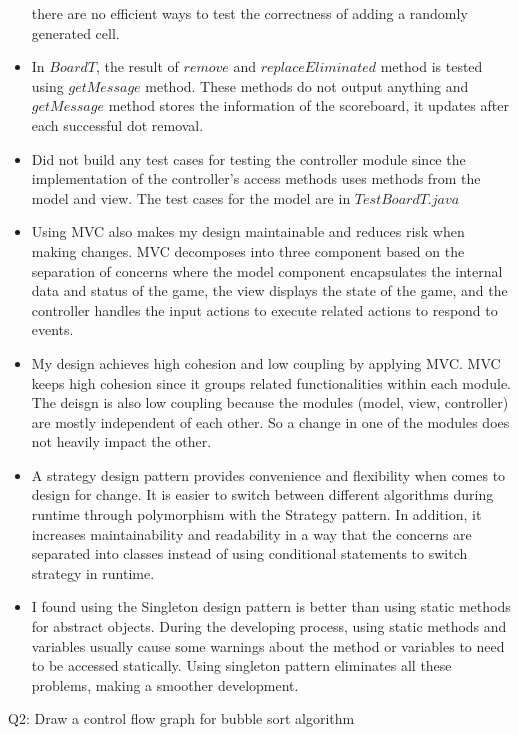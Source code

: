 \documentclass[12pt]{article}
\begin{document}
\begin{itemize}
        there are no efficient ways to test the correctness of adding a randomly generated cell.
  \item In $BoardT$, the result of $remove$ and $replaceEliminated$ method is tested using $getMessage$ method. These methods do
        not output anything and $getMessage$ method stores the information of the scoreboard, it updates after each successful dot removal.
  \item Did not build any test cases for testing the controller module since the implementation of the controller's access methods uses 
        methods from the model and view. The test cases for the model are in $TestBoardT.java$
  \item Using MVC also makes my design maintainable and reduces risk when making changes. MVC decomposes into three 
        component based on the separation of concerns where the model component encapsulates the internal 
        data and status of the game, the view displays the state of the game, and the controller handles
        the input actions to execute related actions to respond to events.
  \item My design achieves high cohesion and low coupling by applying MVC. MVC keeps high cohesion since
        it groups related functionalities within each module. The deisgn is also low coupling because
        the modules (model, view, controller) are mostly independent of each other. So a change in one of the
        modules does not heavily impact the other.
  \item A strategy design pattern provides convenience and flexibility when comes to design for change. It is easier to switch
        between different algorithms during runtime through polymorphism with the Strategy pattern. In addition, it increases
        maintainability and readability in a way that the concerns are separated into classes instead of using
        conditional statements to switch strategy in runtime.
  \item I found using the Singleton design pattern is better than using static methods for abstract objects. During the developing process, using 
        static methods and variables usually cause some warnings about the method or variables to need to be accessed statically. Using singleton
        pattern eliminates all these problems, making a smoother development.
  
\end{itemize}



\noindent Q2: Draw a control flow graph for bubble sort algorithm
\end{document}
